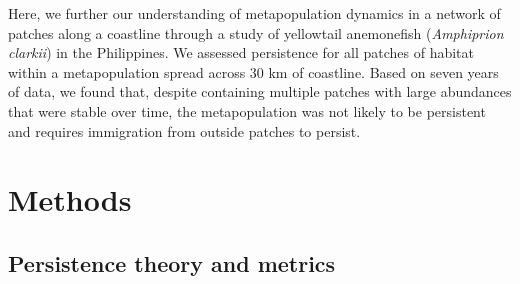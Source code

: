 \documentclass[12pt, oneside]{article}   	%
\begin{document}


Here, we further our understanding of metapopulation dynamics in a network of patches along a coastline through a study of yellowtail anemonefish (\textit{Amphiprion clarkii}) in the Philippines. We assessed persistence for all patches of habitat within a metapopulation spread across 30 km of coastline. Based on seven years of data, we found that, despite containing multiple patches with large abundances that were stable over time, the metapopulation was not likely to be persistent and requires immigration from outside patches to persist.%

\section*{Methods} 

\subsection*{Persistence theory and metrics}
\end{document}
